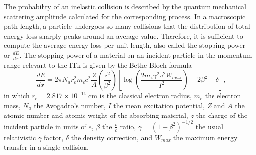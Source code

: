 The probability of an inelastic collision is described by the quantum mechanical scattering amplitude calculated for the corresponding process. 
In a macroscopic path length, a particle undergoes so many collisions that the distribution of total energy loss sharply peaks around an average value. 
Therefore, it is sufficient to compute the average energy loss per unit length, also called the stopping power or $\frac{dE}{dx}$. 
The stopping power of a material on an incident particle in the momentum range relevant to the ITk is given by the Bethe-Bloch formula \cite{Zyla:2020zbs}
\begin{equation}
    \label{eq:6.1}
    -\frac{dE}{dx} = 2\pi N_a r_e^2 m_e c^2 \frac{Z}{A} \left( \frac{z^2}{\beta^2}\right) \left[ \log \left( \frac{2m_e \gamma^2 v^2 W_{max}}{I^2}\right) - 2\beta^2 -\delta   \right],
\end{equation}
in which $r_e = 2.817\times 10^{-13}$ cm is the classical electron radius, $m_e$ the electron mass, $N_a$ the Avogadro's number, $I$ the mean excitation potential, $Z$ and $A$ the atomic number and atomic weight of the absorbing material, $z$ the charge of the incident particle in units of $e$, $\beta $ the $\frac{v}{c}$ ratio, $\gamma = (1-\beta^2)^{-1/2}$ the usual relativistic $\gamma$ factor, $\delta$ the density correction, and $W_{max}$ the maximum energy transfer in a single collision.
